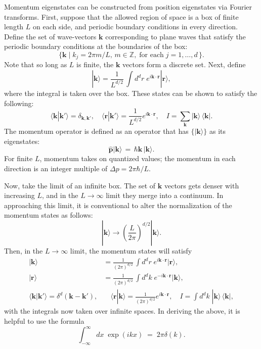 \documentclass[pra,11pt]{revtex4}
\begin{document}
Momentum eigenstates can be constructed from position eigenstates via
Fourier transforms.  First, suppose that the allowed region of space
is a box of finite length $L$ on each side, and periodic boundary
conditions in every direction.  Define the set of wave-vectors
$\mathbf{k}$ corresponding to plane waves that satisfy the periodic
boundary conditions at the boundaries of the box:
$$\Big\{\mathbf{k}  \; \Big| \; k_j = 2\pi m/L, \,m\in\mathbb{Z}, \;\text{for each} \; j = 1, \dots,d\, \Big\}.$$
Note that so long as $L$ is finite, the $\mathbf{k}$ vectors form a
discrete set.  Next, define
$$|\mathbf{k}\rangle = \frac{1}{L^{d/2}} \, \int d^dr \; e^{i\mathbf{k}\cdot\mathbf{r}} |\mathbf{r}\rangle,$$
where the integral is taken over the box.  These states
can be shown to satisfy the following:
$$\langle\mathbf{k}|\mathbf{k}'\rangle = \delta_{\mathbf{k},\mathbf{k}'}, \quad \langle\mathbf{r}|\mathbf{k}'\rangle = \frac{1}{L^{d/2}} e^{i\mathbf{k}\cdot\mathbf{r}}, \quad I = \sum_{\mathbf{k}} |\mathbf{k}\rangle\,\langle\mathbf{k}|.$$
The momentum operator is defined as an operator that has
$\{|\mathbf{k}\rangle\}$ as its eigenstates:
$$\hat{\mathbf{p}} |\mathbf{k}\rangle \,=\, \hbar \mathbf{k}\, |\mathbf{k}\rangle.$$
For finite $L$, momentum takes on quantized values; the momentum in
each direction is an integer multiple of $\Delta p = 2\pi\hbar/L$.

Now, take the limit of an infinite box.  The set of $\mathbf{k}$
vectors gets denser with increasing $L$, and in the $L \rightarrow
\infty$ limit they merge into a continuum.  In approaching this limit,
it is conventional to alter the normalization of the momentum states
as follows:
$$|\mathbf{k}\rangle \rightarrow \left(\frac{L}{2\pi}\right)^{d/2} |\mathbf{k}\rangle.$$
Then, in the $L\rightarrow\infty$ limit, the momentum states will
satisfy
$$\boxed{\begin{aligned} |\mathbf{k}\rangle &= \frac{1}{(2\pi)^{d/2}} \, \int d^dr \; e^{i\mathbf{k}\cdot\mathbf{r}} |\mathbf{r}\rangle, \\ |\mathbf{r}\rangle &= \frac{1}{(2\pi)^{d/2}} \, \int d^dk \; e^{-i\mathbf{k}\cdot\mathbf{r}} |\mathbf{k}\rangle, \\\langle\mathbf{k}|\mathbf{k}'\rangle = \delta^d(\mathbf{k}-\mathbf{k}'),& \quad \langle\mathbf{r}|\mathbf{k}\rangle = \frac{1}{(2\pi)^{d/2}} e^{i\mathbf{k}\cdot\mathbf{r}}, \quad I = \int d^dk \;|\mathbf{k}\rangle\,\langle\mathbf{k}|,\end{aligned}}$$
with the integrals now taken over infinite spaces.  In deriving
the above, it is helpful to use the formula
$$\int_{-\infty}^\infty dx\; \exp(ikx) \;=\; 2\pi\delta(k).$$
\end{document}
